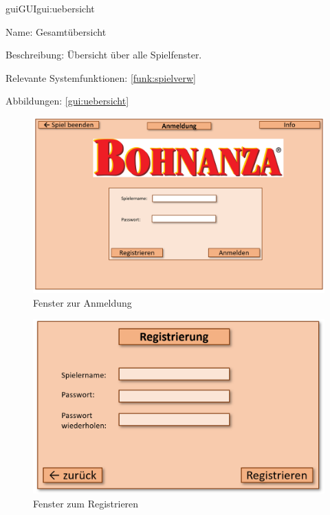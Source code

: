 \begin{description}[leftmargin=5em, style=sameline]	
	\begin{lhp}{gui}{GUI}{gui:uebersicht}
		\item[Name:] Gesamtübersicht
		\item[Beschreibung:] Übersicht über alle Spielfenster.
		\item[Relevante Systemfunktionen:] \ref{funk:spielverw}
		\item[Abbildungen:] \ref{gui:uebersicht}
	\end{lhp}
\end{description}


\begin{figure}
	\centering
	\includegraphics{img/anm}
	\caption{Fenster zur Anmeldung}
	\label{gui:anm}
\end{figure}

\begin{figure}
	\centering
	\includegraphics{img/reg}
	\caption{Fenster zum Registrieren}
	\label{gui:reg}
\end{figure}

